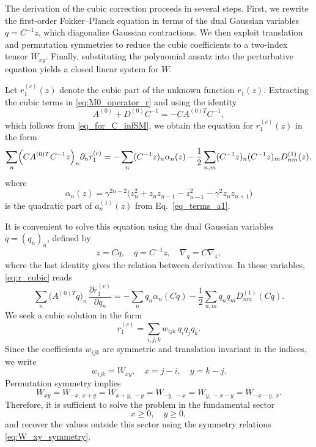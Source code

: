 \documentclass[aps,twocolumn,superscriptaddress]{revtex4-2}
\begin{document}
The derivation of the cubic correction proceeds in several steps. First, we rewrite the first-order Fokker--Planck equation in terms of the dual Gaussian variables \(q=C^{-1}z\), which diagonalize Gaussian contractions. We then exploit translation and permutation symmetries to reduce the cubic coefficients to a two-index tensor \(W_{xy}\). Finally, substituting the polynomial ansatz into the perturbative equation yields a closed linear system for \(W\).

Let \(r_1^{(c)}(z)\) denote the cubic part of the unknown function \(r_1(z)\).
Extracting the cubic terms in \eqref{eq:M0_operator_r} and using the identity
\[
A^{(0)}+D^{(0)}C^{-1}=-CA^{(0)T}C^{-1},
\]
which follows from \eqref{eq_for_C_infSM}, we obtain the equation for \(r_1^{(c)}(z)\) in the form
\begin{equation}
\sum_n \Bigl(CA^{(0)T}C^{-1}z\Bigr)_n \partial_n r_1^{(c)}
= -\sum_n (C^{-1}z)_n \alpha_n(z)
-\frac12\sum_{n,m}
(C^{-1}z)_n(C^{-1}z)_mD^{(1)}_{nm}(z),
\label{eq:r_cubic}
\end{equation}
where
\begin{equation}
\label{eq_alpha_n}
\alpha_n(z)
= \gamma^{2n-2}\bigl(
z_n^2+z_n z_{n-1}-z_{n-1}^2-\gamma^2 z_n z_{n+1}
\bigr)
\end{equation}
is the quadratic part of \(a_n^{(1)}(z)\) from Eq.~\eqref{eq_terms_a1}.

It is convenient to solve this equation using the dual Gaussian variables
\(q=(q_n)_{n}\), defined by
\begin{equation}
\label{eq_dual_G}
z = Cq, \quad q = C^{-1}z, \quad \nabla_q = C \nabla_z,
\end{equation}
where the last identity gives the relation between derivatives.
In these variables, \eqref{eq:r_cubic} reads
\begin{equation}
\label{eq_FO_cubic_C}
\sum_n \big(A^{(0)T}q\big)_n \,\frac{\partial r_1^{(c)}}{\partial q_n}
=
-\sum_n q_n \alpha_n(Cq)
-\frac12\sum_{n,m}q_n q_m D^{(1)}_{nm}(Cq).
\end{equation}
We seek a cubic solution in the form
\begin{equation}
r_1^{(c)} = \sum_{i,j,k} w_{ijk} \,q_i q_j q_k.
\label{eq:r1_cubic_ansatz_app}
\end{equation}
Since the coefficients \(w_{ijk}\) are symmetric and translation invariant in the indices, we write
\begin{equation}
w_{ijk}=W_{xy},\quad x=j-i,\quad y=k-j.
\label{eq:W_xy_definition}
\end{equation}
Permutation symmetry implies
\begin{equation}
W_{xy}
=
W_{-x,\,x+y}
=
W_{x+y,\,-y}
=
W_{-y,\,-x}
=
W_{y,\,-x-y}
=
W_{-x-y,\,x}.
\label{eq:W_xy_symmetry}
\end{equation}
Therefore, it is sufficient to solve the problem in the fundamental sector
\begin{equation}
x\ge 0,\quad y\ge 0,
\label{eq:fund_sector_app}
\end{equation}
and recover the values outside this sector using the symmetry relations \eqref{eq:W_xy_symmetry}.
\end{document}
